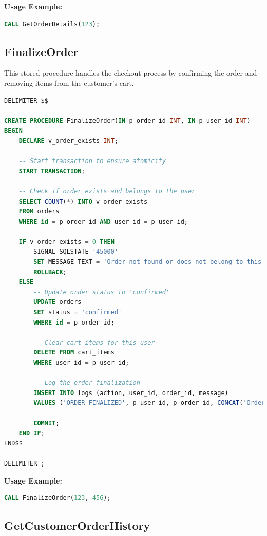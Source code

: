 \documentclass[14pt,a4paper]{article}
\begin{document}
\textbf{Usage Example:}
\begin{lstlisting}[language=SQL, numbers=none]
CALL GetOrderDetails(123);
\end{lstlisting}

\subsection{FinalizeOrder}

This stored procedure handles the checkout process by confirming the order and removing items from the customer's cart.

\begin{lstlisting}[language=SQL, caption={FinalizeOrder Stored Procedure}, label={lst:finalize-order}]
DELIMITER $$

CREATE PROCEDURE FinalizeOrder(IN p_order_id INT, IN p_user_id INT)
BEGIN
    DECLARE v_order_exists INT;
    
    -- Start transaction to ensure atomicity
    START TRANSACTION;
    
    -- Check if order exists and belongs to the user
    SELECT COUNT(*) INTO v_order_exists 
    FROM orders 
    WHERE id = p_order_id AND user_id = p_user_id;
    
    IF v_order_exists = 0 THEN
        SIGNAL SQLSTATE '45000' 
        SET MESSAGE_TEXT = 'Order not found or does not belong to this user';
        ROLLBACK;
    ELSE
        -- Update order status to 'confirmed'
        UPDATE orders 
        SET status = 'confirmed' 
        WHERE id = p_order_id;
        
        -- Clear cart items for this user
        DELETE FROM cart_items 
        WHERE user_id = p_user_id;
        
        -- Log the order finalization
        INSERT INTO logs (action, user_id, order_id, message) 
        VALUES ('ORDER_FINALIZED', p_user_id, p_order_id, CONCAT('Order #', p_order_id, ' has been finalized'));
        
        COMMIT;
    END IF;
END$$

DELIMITER ;
\end{lstlisting}

\textbf{Usage Example:}
\begin{lstlisting}[language=SQL, numbers=none]
CALL FinalizeOrder(123, 456);
\end{lstlisting}

\subsection{GetCustomerOrderHistory}
\end{document}
